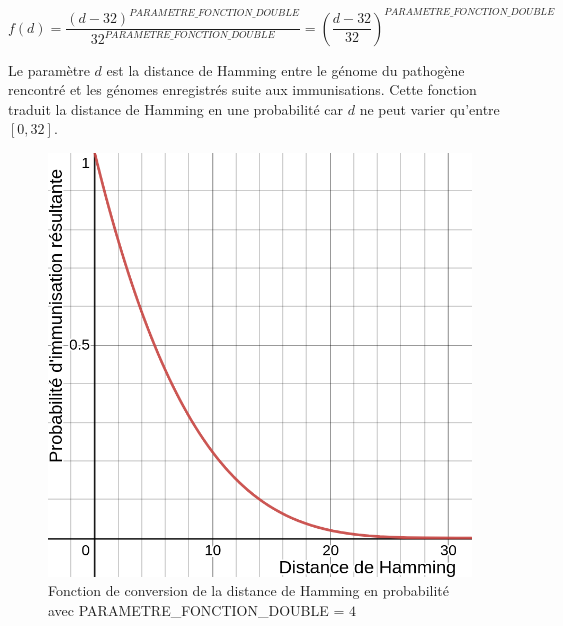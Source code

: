 $$
f(d) = \frac{(d-32)^{PARAMETRE\_FONCTION\_DOUBLE}}{32^{PARAMETRE\_FONCTION\_DOUBLE}} = (\frac{d-32}{32})^{PARAMETRE\_FONCTION\_DOUBLE}
$$

Le paramètre $d$ est la distance de Hamming entre le génome du pathogène rencontré et les génomes enregistrés suite aux immunisations. Cette fonction traduit la distance de Hamming en une probabilité car $d$ ne peut varier qu'entre $[0,32]$.

\newpage

\begin{figure}[h]
  \centering
    \captionsetup{justification=centering}
  \begin{minipage}[b]{0.4\textwidth}
    \includegraphics[width=\textwidth]{Images/doubleHamming4.png}
    \caption[Fonction (double) de converstion en probabilité (facteur 4)]{Fonction de conversion de la distance de Hamming en probabilité avec {\tiny PARAMETRE\_FONCTION\_DOUBLE} = $4$}
  \end{minipage}
  \hfill
  \begin{minipage}[b]{0.4\textwidth}

\end{minipage}
\end{figure}
